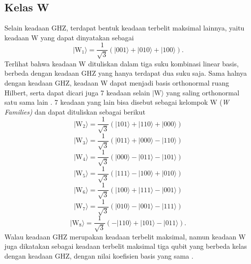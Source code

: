\subsection{Kelas W}
Selain keadaan GHZ, terdapat bentuk keadaan terbelit maksimal lainnya, yaitu keadaan W yang dapat dinyatakan sebagai
\begin{equation}
	|\mathrm{W_1}\rangle = \frac{1}{\sqrt{3}}(|001\rangle + |010\rangle + |100\rangle).
\end{equation}
Terlihat bahwa keadaan W dituliskan dalam tiga suku kombinasi linear basis, berbeda dengan keadaan GHZ yang hanya terdapat dua suku saja. Sama halnya dengan keadaan GHZ, keadaan W dapat menjadi basis orthonormal ruang Hilbert, serta dapat dicari juga 7 keadaan selain $|\mathrm{W}\rangle$ yang saling orthonormal satu sama lain \cite{acin2001classification, bastin2009multipartite, braginskii2013entanglement}. 7 keadaan yang lain bisa disebut sebagai kelompok W (\textit{W Families)} dan dapat dituliskan sebagai berikut
\begin{equation}
	|\mathrm{W_2}\rangle = \frac{1}{\sqrt{3}}(|101\rangle + |110\rangle + |000\rangle)
\end{equation}
\begin{equation}
	|\mathrm{W_3}\rangle = \frac{1}{\sqrt{3}}(|011\rangle + |000\rangle - |110\rangle)
\end{equation}
\begin{equation}
	|\mathrm{W_4}\rangle = \frac{1}{\sqrt{3}}(|000\rangle - |011\rangle - |101\rangle)
\end{equation}
\begin{equation}
	|\mathrm{W_5}\rangle = \frac{1}{\sqrt{3}}(|111\rangle - |100\rangle + |010\rangle)
\end{equation}
\begin{equation}
	|\mathrm{W_6}\rangle = \frac{1}{\sqrt{3}}(|100\rangle + |111\rangle - |001\rangle)
\end{equation}
\begin{equation}
	|\mathrm{W_7}\rangle = \frac{1}{\sqrt{3}}(|010\rangle - |001\rangle - |111\rangle)
\end{equation}
\begin{equation}
	|\mathrm{W_8}\rangle = \frac{1}{\sqrt{3}}(-|110\rangle + |101\rangle - |011\rangle).
\end{equation}
Walau keadaan GHZ merupakan keadaan terbelit maksimal, namun keadaan W juga dikatakan sebagai keadaan terbelit maksimal tiga qubit yang berbeda kelas dengan keadaan GHZ, dengan nilai koefisien basis yang sama \cite{dur2000three}.

